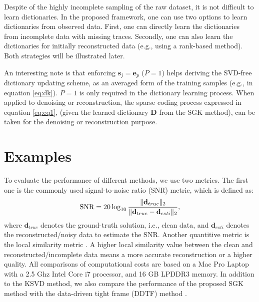 
Despite of the highly incomplete sampling of the raw dataset, it is not difficult to learn dictionaries.  In the proposed framework, one can use two options to learn dictionaries from observed data. First, one can directly learn the dictionaries from incomplete data with missing traces. Secondly, one can also learn the dictionaries for initially reconstructed data (e.g., using a rank-based method). Both strategies will be illustrated later. 

An interesting note is that enforcing $\mathbf{s}_j =\mathbf{e}_p$ ($P=1$) helps deriving the SVD-free dictionary updating scheme, as an averaged form of the training samples (e.g., in equation \ref{eq:dk}). $P=1$ is only required in the dictionary learning process. When applied to denoising or reconstruction, the sparse coding process expressed in equation \ref{eq:eq1}, (given the learned dictionary $\mathbf{D}$ from the SGK method), can be taken for the denoising or reconstruction purpose.

\section{Examples}
To evaluate the performance of different methods, we use two metrics. The first one is the commonly used signal-to-noise ratio (SNR) metric, which is defined as:
\begin{equation}
\label{eq:snr}
\text{SNR}=20\log_{10}\frac{\Arrowvert \mathbf{d}_{true} \Arrowvert_2}{\Arrowvert \mathbf{d}_{true} -\mathbf{d}_{esti}\Arrowvert_2},
\end{equation}
where $\mathbf{d}_{true}$ denotes the ground-truth solution, i.e., clean data, and $\mathbf{d}_{esti}$ denotes the reconstructed/noisy data to estimate the SNR. Another quantitive metric is the local similarity metric \cite{fomel2007localattr,yangkang2015ortho}. A higher local similarity value between the clean and reconstructed/incomplete data means a more accurate reconstruction or a higher quality. All comparisons of computational costs are based on a Mac Pro Laptop with a 2.5 Ghz Intel Core i7 processor, and 16 GB LPDDR3 memory. In addition to the KSVD method, we also compare the performance of the proposed SGK method with the data-driven tight frame (DDTF) method \cite{siwei2016}.


